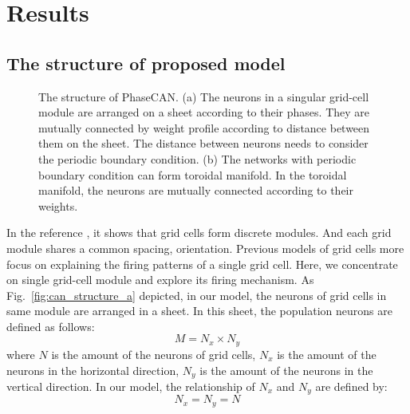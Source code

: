 \documentclass[final,5p,times,twocolumn,authoryear]{elsarticle}
\begin{document}
\section{Results}

\subsection{The structure of proposed model}\label{subsection:structure}

\begin{figure}[!t]
	\centering
	\hspace{-2pt}	

	\caption{The structure of PhaseCAN. (a) The neurons in a singular grid-cell module are arranged on a sheet according to their phases. They are mutually connected by weight profile according to distance between them on the sheet. The distance between neurons needs to consider the periodic boundary condition. (b) The networks with periodic boundary condition can form toroidal manifold. In the toroidal manifold, the neurons are mutually connected according to their weights.}
	\label{fig:can_structure}
\end{figure}


In the reference \citep{Stensola2012}, it shows that grid cells form discrete modules. And each grid module shares a common spacing, orientation\citep{Rowland2016}. Previous models of grid cells more focus on explaining the firing patterns of a single grid cell. Here, we concentrate on single grid-cell module and explore its firing mechanism. As Fig.~\ref{fig:can_structure_a} depicted, in our model, the neurons of grid cells in same module are arranged in a sheet. In this sheet, the population neurons are defined as follows:
\begin{equation}
	M = N_x \times N_y
\end{equation}
where $N$ is the amount of the neurons of grid cells, $N_x$ is the amount of the neurons in the horizontal direction, $N_y$ is the amount of the neurons in the vertical direction. In our model, the relationship of $N_x$ and $N_y$ are defined by:
\begin{equation}\label{eq:network_size}
	N_x = N_y = N
\end{equation}
\end{document}
